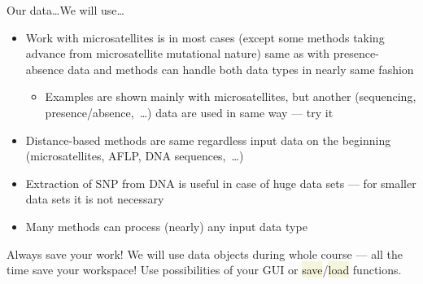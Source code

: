 \documentclass[compress, xelatex, 11pt, xcolor=svgnames, aspectratio=169, url={hyphens, lowtilde}]{beamer}
\renewcommand{\texttt}[1]{\colorbox{Beige}{{\ttfamily #1}}}
\begin{document}
\begin{frame}[allowframebreaks]{Our data\ldots}{We will use\ldots}
\begin{itemize}
\begin{itemize}
				\item Measurements of \textit{Iris setosa}, \textit{I. versicolor} and \textit{I. virginica}, \texttt{?iris} --- measurements of morphological characters, their correlations and differences among species
				\item Phylogeny and morphological traits of shorebirds, \texttt{?caper::shorebird} --- comparative evolution of characters
			\end{itemize}
		\item Work with microsatellites is in most cases (except some methods taking advance from microsatellite mutational nature) same as with presence-absence data and methods can handle both data types in nearly same fashion
		\begin{itemize}
			\item Examples are shown mainly with microsatellites, but another (sequencing, presence/absence,~\ldots) data are used in same way --- try it
		\end{itemize}
		\item Distance-based methods are same regardless input data on the beginning (microsatellites, AFLP, DNA sequences,~\ldots)
		\item Extraction of SNP from DNA is useful in case of huge data sets --- for smaller data sets it is not necessary
		\item Many methods can process (nearly) any input data type
	\end{itemize}
	\begin{alertblock}{Always save your work!}
		\alert{We will use data objects during whole course --- all the time save your workspace!} Use possibilities of your GUI or \texttt{save}/\texttt{load} functions.
	\end{alertblock}
\end{frame}
\end{document}
